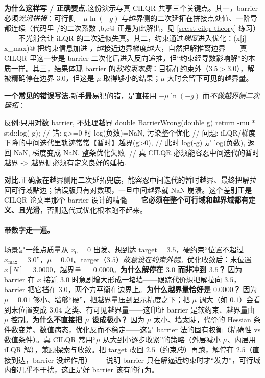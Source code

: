 \noindent\textbf{为什么这样写 / 正确要点.}\;这份演示与真 CILQR 共享三个关键点。其一，barrier 必须\emph{光滑拼接}：可行侧 $-\mu\ln(-g)$ 与越界侧的二次延拓在拼接点处值、一阶导都连续（代码里 \verb@Barrier@/\verb@BarrierGrad@ 的二次系数 \verb@a,b,c@ 正是为此解出，见 \cref{sec:st-cilqr-theory} 练习）——不光滑会让 iLQR 的二次近似失真。其二，约束通过\emph{梯度}进入优化：\verb@BarrierGrad(x[j]-x_max)@ 把约束信息加进 \verb@grad@，越接近边界梯度越大，自然把解推离边界——真 CILQR 里这一步是 barrier 二次化后进入反向递推，但“约束经导数影响解”的本质一样。其三，结果体现 barrier 的\emph{软约束本质}：目标在约束外（$3.5>3.0$），解被精确停在边界 $3.0$，但这是 $\mu$ 取得够小的结果；$\mu$ 大时会留下可见的越界量。

\noindent{}\textbf{一个常见的错误写法.}\;新手最易犯的错，是直接用 $-\mu\ln(-g)$ 而\emph{不做越界侧二次延拓}：

\begin{codebox}[C++]{反例:只用对数 barrier, 不处理越界}
double BarrierWrong(double g) {
  return -mu * std::log(-g);   // 错: g>=0 时 log(负数)=NaN, 污染整个优化
}
// 问题: iLQR/梯度下降的中间迭代里轨迹常常【暂时】越界(g>0),
//       此时 log(-g) 是 log(负数), 返回 NaN, 梯度变成 NaN, 整条优化失败.
//       真 CILQR 必须能容忍中间迭代的暂时越界 -> 越界侧必须有定义良好的延拓.
\end{codebox}

\noindent\textbf{对比.}\;正确版在越界侧用二次延拓兜底，能容忍中间迭代的暂时越界、最终把解拉回可行域贴边；错误版只有对数项，一旦中间越界就 NaN 崩溃。这个差别正是 CILQR 论文里那个 barrier 设计的精髓——\textbf{它必须在整个可行域和越界域都有定义、且光滑}，否则迭代式优化根本跑不起来。

\paragraph{带数字走一遍。}
场景是一维点质量从 $x_0=0$ 出发、想到达 $\text{target}=3.5$，硬约束“位置不超过 $x_{\max}=3.0$”，$\mu=0.01$。target（$3.5$）\emph{故意设在约束外侧}。优化收敛后：末位置 $x[N]=3.0000$，越界量 $=0.0000$。\textbf{为什么解停在 $3.0$ 而非冲到 $3.5$？} 因为 barrier 在 $x$ 接近 $3.0$ 时急剧增大形成一堵墙——跟踪代价想把解拉向 $3.5$，barrier 把它挡在 $3.0$，两个力平衡在边界上。\textbf{为什么越界量恰好是 $0.0000$？} 因为 $\mu=0.01$ 够小、墙够“硬”，把越界量压到显示精度之下；把 $\mu$ 调大（如 $0.1$）会看到末位置变成 $3.04$ 之类、有可见越界量——这印证 barrier 是软约束、越界量由 $\mu$ 控制。\textbf{为什么不直接把 $\mu$ 设成极小？} 因为 $\mu$ 太小、墙太陡，代价的 Hessian 条件数变差、数值病态，优化反而不稳定——这是 barrier 法的固有权衡（精确性 vs 数值条件）。真 CILQR 常用“$\mu$ 从大到小逐步收紧”的策略（外层减小 $\mu$、内层用 iLQR 解），兼顾探索与收敛。把 target 改回 $2.5$（约束\emph{内}）再跑，解停在 $2.5$（直接到达，barrier 没起作用）——说明 barrier 只在解逼近约束时才“发力”，可行域内部几乎不干扰，这正是好 barrier 该有的行为。

